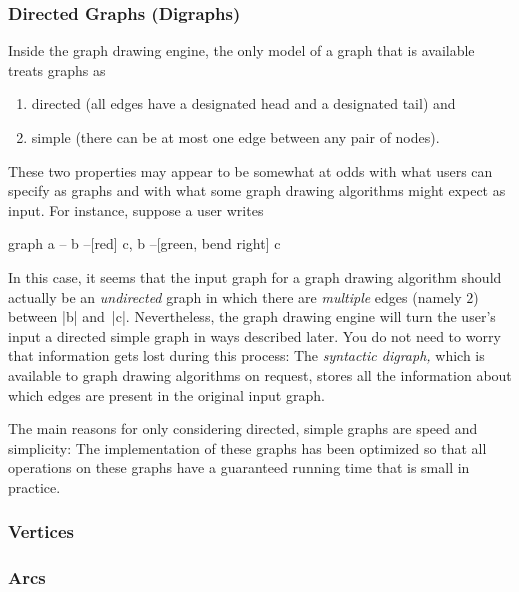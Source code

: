 \subsubsection{Directed Graphs (Digraphs)}

Inside the graph drawing engine, the only model of a graph that is available
treats graphs as
%
\begin{enumerate}
    \item directed (all edges have a designated head and a designated tail) and
    \item simple (there can be at most one edge between any pair of nodes).
\end{enumerate}
%
These two properties may appear to be somewhat at odds with what users can
specify as graphs and with what some graph drawing algorithms might expect as
input. For instance, suppose a user writes
%
\begin{codeexample}
graph { a -- b --[red] c, b --[green, bend right] c }
\end{codeexample}
%
In this case, it seems that the input graph for a graph drawing algorithm
should actually be an \emph{undirected} graph in which there are
\emph{multiple} edges (namely $2$) between |b| and~|c|. Nevertheless, the graph
drawing engine will turn the user's input a directed simple graph in ways
described later. You do not need to worry that information gets lost during
this process: The \emph{syntactic digraph,} which is available to graph drawing
algorithms on request, stores all the information about which edges are present
in the original input graph.

The main reasons for only considering directed, simple graphs are speed and
simplicity: The implementation of these graphs has been optimized so that all
operations on these graphs have a guaranteed running time that is small in
practice.



\subsubsection{Vertices}



\subsubsection{Arcs}
\label{section-gd-arc-model}

